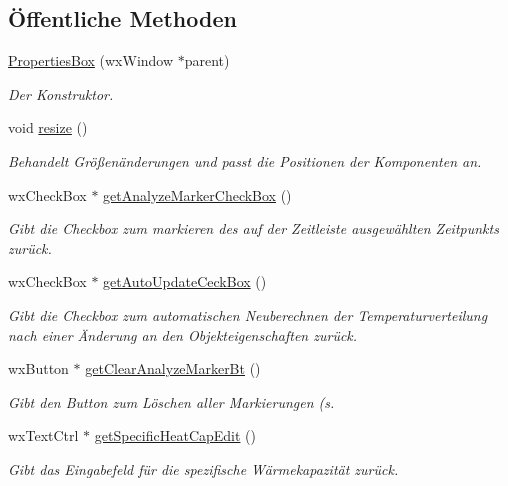 \subsection*{Öffentliche Methoden}
\begin{DoxyCompactItemize}
\item 
\hyperlink{classPropertiesBox_a9218399db23aa9a4200ccf60edd74f5a}{Properties\-Box} (wx\-Window $\ast$parent)
\begin{DoxyCompactList}\small\item\em Der Konstruktor. \end{DoxyCompactList}\item 
void \hyperlink{classPropertiesBox_adce6c28da4adced9bb98937c5cb85de0}{resize} ()
\begin{DoxyCompactList}\small\item\em Behandelt Größenänderungen und passt die Positionen der Komponenten an. \end{DoxyCompactList}\item 
wx\-Check\-Box $\ast$ \hyperlink{classPropertiesBox_a13b9ce3aa1761689ff4be9fadeab2d87}{get\-Analyze\-Marker\-Check\-Box} ()
\begin{DoxyCompactList}\small\item\em Gibt die Checkbox zum markieren des auf der Zeitleiste ausgewählten Zeitpunkts zurück. \end{DoxyCompactList}\item 
wx\-Check\-Box $\ast$ \hyperlink{classPropertiesBox_a0def09e75b2c748b2bb8fb78369a422c}{get\-Auto\-Update\-Ceck\-Box} ()
\begin{DoxyCompactList}\small\item\em Gibt die Checkbox zum automatischen Neuberechnen der Temperaturverteilung nach einer Änderung an den Objekteigenschaften zurück. \end{DoxyCompactList}\item 
wx\-Button $\ast$ \hyperlink{classPropertiesBox_ad788ed8a06f21958e3c6ea043a162918}{get\-Clear\-Analyze\-Marker\-Bt} ()
\begin{DoxyCompactList}\small\item\em Gibt den Button zum Löschen aller Markierungen (s. \end{DoxyCompactList}\item 
wx\-Text\-Ctrl $\ast$ \hyperlink{classPropertiesBox_a84eb37f7bc965f3eecb638d63fa4af48}{get\-Specific\-Heat\-Cap\-Edit} ()
\begin{DoxyCompactList}\small\item\em Gibt das Eingabefeld für die spezifische Wärmekapazität zurück. \end{DoxyCompactList}\item 

\end{DoxyCompactItemize}
